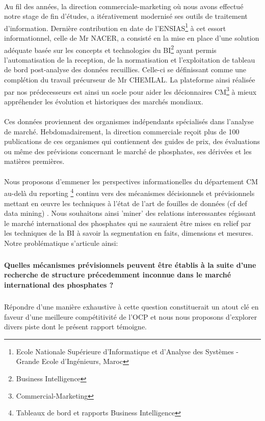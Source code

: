 	\paragraph{}
Au fil des années, la direction commerciale-marketing où nous avons effectué notre stage de fin d'études, a itérativement modernisé ses outils de traitement d'information. Dernière contribution en date de l'ENSIAS\footnote{Ecole Nationale Supérieure d'Informatique et d'Analyse des Systèmes - Grande Ecole d'Ingénieurs, Maroc} à cet essort informationnel, celle de Mr NACER, a consisté en la mise en place d'une solution adéquate basée sur les concepts et technologies du BI\footnote{Business Intelligence} ayant permis l'automatisation de la reception, de la normatisation et l'exploitation de tableau de bord post-analyse des données recuillies\cite{NACER}. Celle-ci se définissant comme une complétion du travail précurseur de Mr CHEMLAL\cite{CHEMLAL}.  La plateforme ainsi réalisée par nos prédecesseurs est ainsi un socle pour aider les décionnaires CM\footnote{Commercial-Marketing} à mieux appréhender les évolution et historiques des marchés mondiaux.\paragraph{}Ces données proviennent des organismes indépendants spécialisés dans l'analyse de marché. Hebdomadairement, la direction commerciale reçoit plus de 100 publications de ces organismes qui contiennent des guides de prix, des évaluations ou même des prévisions concernant le marché de phosphates, ses dérivées et les matières premières.\paragraph{}Nous proposons d'emmener les perspectives informationelles du département CM au-delà du reporting \footnote{Tableaux de bord et rapports Business Intelligence} continu vers des mécanismes décisionnels et prévisionnels mettant en œuvre les techniques à l'état de l'art de fouilles de données (cf def data mining) . Nous souhaitons ainsi 'miner' des relations interessantes régissant le marché international des phosphates qui ne sauraient être mises en relief par les techniques de la BI à savoir la segmentation en faits, dimensions et mesures. Notre problématique s'articule ainsi:\subparagraph*{}\textbf{Quelles mécanismes prévisionnels peuvent être établis à la suite d'une recherche de structure précedemment inconnue dans le marché international des phosphates ?}\subparagraph*{}Répondre d'une manière exhaustive à cette question constituerait un atout clé en faveur d'une meilleure compétitivité de l'OCP et nous nous proposons d'explorer divers piste dont le présent rapport témoigne. 

